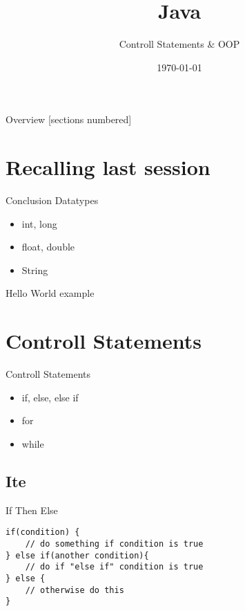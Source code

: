 


\title{Java}
\subtitle{Controll Statements \& OOP}
\date{\today}



\begin{frame}
	\titlepage
\end{frame}
\begin{frame}{Overview}
	[sections numbered]
	\tableofcontents
\end{frame}

\section{Recalling last session}
\begin{frame}{Conclusion}
	Datatypes
	\begin{itemize}
		\item int, long
		\item float, double
		\item String
	\end{itemize}
	Hello World example
\end{frame}

\section{Controll Statements}
\begin{frame}{Controll Statements}
	
	\begin{itemize}
		\item if, else, else if
		\item for
		\item while
	\end{itemize}
		
\end{frame}

\subsection{Ite}
\begin{frame}[fragile]{{\huge I}f {\huge T}hen {\huge E}lse}
\begin{lstlisting}
if(condition) {
	// do something if condition is true
} else if(another condition){
	// do if "else if" condition is true 
} else {
	// otherwise do this
}
\end{lstlisting}
\end{frame}

